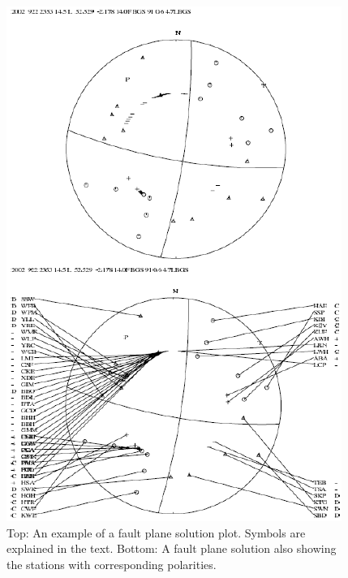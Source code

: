 \begin{figure}
\centerline{\includegraphics[width=0.9\linewidth]{fig/fig38}}
\caption{Top: An example of a fault plane solution plot. Symbols are explained 
in the text. Bottom: A fault plane solution also showing the stations with corresponding polarities. 
}
\label{fig:focmec}
\end{figure}

